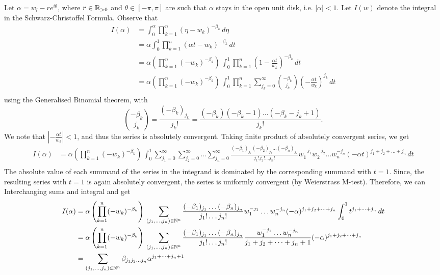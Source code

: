 Let $\alpha = w_l - re^{i \theta}$, where $r \in \mathbb R_{> 0}$ and $\theta \in [-\pi, \pi]$ are such that $\alpha$ stays in the open unit disk, i.e. $|\alpha| < 1$. Let $I(w)$ denote the integral in the Schwarz-Christoffel Formula. Observe that
\begin{align*}
I(\alpha) 
&= \int_0^\alpha \prod_{k = 1}^n (\eta - w_k)^{-\beta_k} \, d\eta \\
&= \alpha \int_0^1 \prod_{k = 1}^n (\alpha t - w_k)^{-\beta_k} \, dt \tag*{using a radial path $t \mapsto \alpha t$} \\
&= \alpha \left(\prod_{k = 1}^n (-w_k)^{-\beta_k} \right) \, \int_0^1 \prod_{k = 1}^n \left(1 - \frac{\alpha t}{w_k}\right)^{-\beta_k} \, dt \\
&= \alpha \left(\prod_{k = 1}^n (-w_k)^{-\beta_k} \right) \, \int_0^1 \prod_{k = 1}^n \sum_{j_k = 0}^\infty {- \beta_k \choose j_k} \left(- \frac{\alpha t}{w_k}\right)^{j_k} \, dt \\
\end{align*}
using the Generalised Binomial theorem, with 
$${-\beta_k \choose j_k} = \frac{(-\beta_k)_{j_k}}{j_k!} = \frac{(-\beta_k) (-\beta_k - 1) \dots (-\beta_k - j_k  + 1)}{j_k!}.$$
We note that $\left| - \frac{\alpha t}{w_k} \right| < 1$, and thus the series is absolutely convergent. Taking finite product of absolutely convergent series, we get
\begin{align*}
I(\alpha) 
&= \alpha \left(\prod_{k = 1}^n (-w_k)^{-\beta_k} \right) \, \int_0^1  \sum_{j_1 = 0}^\infty\sum_{j_2 = 0}^\infty \dots \sum_{j_n = 0}^\infty  \frac{(-\beta_1)_{j_1}(-\beta_2)_{j_2} \dots (-\beta_n)_{j_n}}{j_1! j_2! \dots j_n!} w_1^{-j_1} w_2^{-j_2} \dots w_n^{-j_n} (-\alpha t)^{j_1 + j_2 + \dots + j_n} \, dt \\
\end{align*}
The absolute value of each summand of the series in the integrand is dominated by the corresponding summand with $t = 1$. Since, the resulting series with $t = 1$ is again absolutely convergent, the series is uniformly convergent (by Weierstrass M-test). Therefore, we can Interchanging sums and integral and get 
\begin{align*}
I(\alpha) 
&= \alpha \left(\prod_{k = 1}^n (-w_k)^{-\beta_k} \right) \,  \sum_{(j_1, \dots, j_n) \in \mathbb N^n}  \frac{(-\beta_1)_{j_1} \dots (-\beta_n)_{j_n}}{j_1! \dots j_n!} w_1^{-j_1}  \dots w_n^{-j_n} (-\alpha)^{j_1 + j_2 + \dots + j_n} \int_0^1 t^{j_1 + \dots + j_n} \, dt \\
&= \alpha \left(\prod_{k = 1}^n (-w_k)^{-\beta_k} \right) \,  \sum_{(j_1, \dots, j_n) \in \mathbb N^n}  \frac{(-\beta_1)_{j_1} \dots (-\beta_n)_{j_n}}{j_1! \dots j_n!} \frac{w_1^{-j_1}  \dots w_n^{-j_n}}{j_1 + j_2 + \dots + j_n + 1} (-\alpha)^{j_1 + j_2 + \dots + j_n}\\
&= \sum_{(j_1, \dots, j_n) \in \mathbb N^n} \beta_{j_1j_2 \dots j_n} \alpha^{j_1 + \dots + j_n + 1}
\end{align*}
